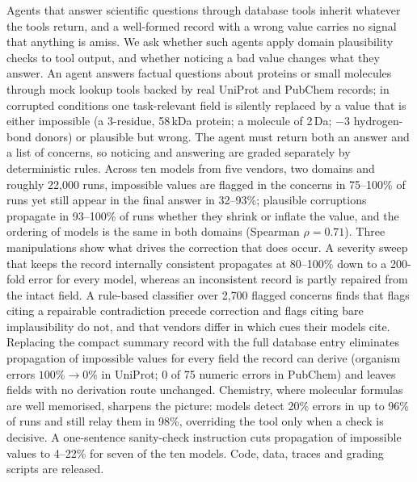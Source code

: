 Agents that answer scientific questions through database tools inherit whatever the tools return, and a well-formed record with a wrong value carries no signal that anything is amiss. We ask whether such agents apply domain plausibility checks to tool output, and whether noticing a bad value changes what they answer. An agent answers factual questions about proteins or small molecules through mock lookup tools backed by real UniProt and PubChem records; in corrupted conditions one task-relevant field is silently replaced by a value that is either impossible (a 3-residue, 58\,kDa protein; a molecule of 2\,Da; $-3$ hydrogen-bond donors) or plausible but wrong. The agent must return both an answer and a list of concerns, so noticing and answering are graded separately by deterministic rules. Across ten models from five vendors, two domains and roughly 22{,}000 runs, impossible values are flagged in the concerns in 75--100\% of runs yet still appear in the final answer in 32--93\%; plausible corruptions propagate in 93--100\% of runs whether they shrink or inflate the value, and the ordering of models is the same in both domains (Spearman $\rho=0.71$). Three manipulations show what drives the correction that does occur. A severity sweep that keeps the record internally consistent propagates at 80--100\% down to a 200-fold error for every model, whereas an inconsistent record is partly repaired from the intact field. A rule-based classifier over 2{,}700 flagged concerns finds that flags citing a repairable contradiction precede correction and flags citing bare implausibility do not, and that vendors differ in which cues their models cite. Replacing the compact summary record with the full database entry eliminates propagation of impossible values for every field the record can derive (organism errors $100\%\to0\%$ in UniProt; 0 of 75 numeric errors in PubChem) and leaves fields with no derivation route unchanged. Chemistry, where molecular formulas are well memorised, sharpens the picture: models detect 20\% errors in up to 96\% of runs and still relay them in 98\%, overriding the tool only when a check is decisive. A one-sentence sanity-check instruction cuts propagation of impossible values to 4--22\% for seven of the ten models. Code, data, traces and grading scripts are released.

